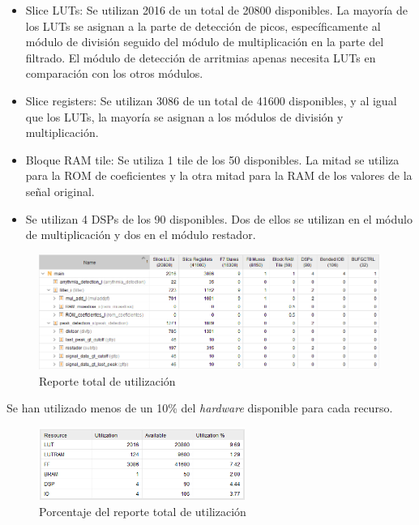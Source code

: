 \begin{itemize}
    \item Slice LUTs: Se utilizan 2016 de un total de 20800 disponibles. La mayoría de los LUTs se asignan a la parte de detección de picos, específicamente al módulo de división seguido del módulo de multiplicación en la parte del filtrado. El módulo de detección de arritmias apenas necesita LUTs en comparación con los otros módulos.
    \item Slice registers: Se utilizan 3086 de un total de 41600 disponibles, y al igual que los LUTs, la mayoría se asignan a los módulos de división y multiplicación.
    \item Bloque RAM tile: Se utiliza 1 tile de los 50 disponibles. La mitad se utiliza para la ROM de coeficientes y la otra mitad para la RAM de los valores de la señal original.
    \item Se utilizan 4 DSPs de los 90 disponibles. Dos de ellos se utilizan en el módulo de multiplicación y dos en el módulo restador.
\end{itemize}


\begin{figure}[h]
	\centering
	\includegraphics[width=0.99\textwidth]{./Images/img_res_experimentales/utilization1.png}
	\caption{Reporte total de utilización}
	\label{fig:utilization1}
\end{figure}

Se han utilizado menos de un 10\% del  \textit{hardware}  disponible para cada recurso.
\begin{figure}[h]
	\centering
	\includegraphics[width=0.6\textwidth]{./Images/img_res_experimentales/utilization2.png}
	\caption{Porcentaje del reporte total de utilización}
	\label{fig:utilization2}
\end{figure}

